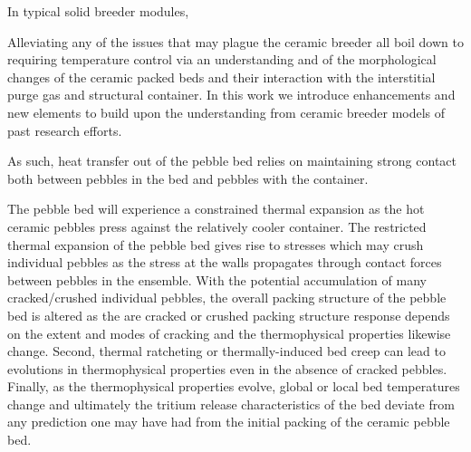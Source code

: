  

In typical solid breeder modules, 

Alleviating any of the issues that may plague the ceramic breeder all boil down to requiring temperature control via an understanding and of the morphological changes of the ceramic packed beds and their interaction with the interstitial purge gas and structural container. In this work we introduce enhancements and new elements to build upon the understanding from ceramic breeder models of past research efforts. 


As such, heat transfer out of the pebble bed relies on maintaining strong contact both between pebbles in the bed and pebbles with the container.

The pebble bed will experience a constrained thermal expansion as the hot ceramic pebbles press against the relatively cooler container. The restricted thermal expansion of the pebble bed gives rise to stresses which may crush individual pebbles as the stress at the walls propagates through contact forces between pebbles in the ensemble. With the potential accumulation of many cracked/crushed individual pebbles, the overall packing structure of the pebble bed is altered as the  are cracked or crushed packing structure response depends on the extent and modes of cracking and the thermophysical properties likewise change. Second, thermal ratcheting or thermally-induced bed creep can lead to evolutions in thermophysical properties even in the absence of cracked pebbles. Finally, as the thermophysical properties evolve, global or local bed temperatures change and ultimately the tritium release characteristics of the bed deviate from any prediction one may have had from the initial packing of the ceramic pebble bed. 





